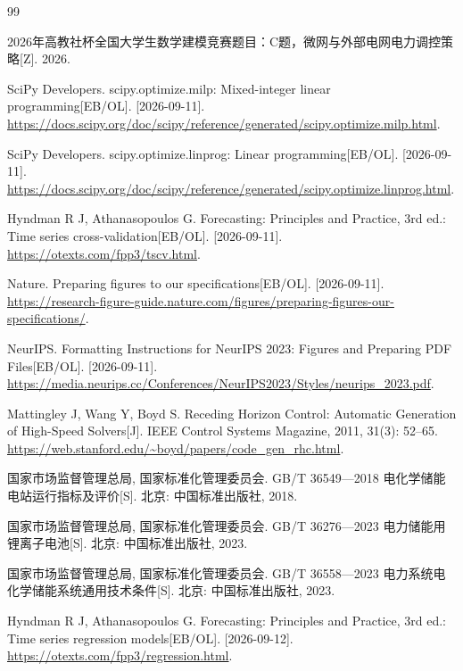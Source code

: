 \begin{thebibliography}{99}

2026年高教社杯全国大学生数学建模竞赛题目：C题，微网与外部电网电力调控策略[Z]. 2026.

SciPy Developers. scipy.optimize.milp: Mixed-integer linear programming[EB/OL].
[2026-09-11]. \url{https://docs.scipy.org/doc/scipy/reference/generated/scipy.optimize.milp.html}.

SciPy Developers. scipy.optimize.linprog: Linear programming[EB/OL].
[2026-09-11]. \url{https://docs.scipy.org/doc/scipy/reference/generated/scipy.optimize.linprog.html}.

Hyndman R J, Athanasopoulos G. Forecasting: Principles and Practice, 3rd ed.: Time series cross-validation[EB/OL].
[2026-09-11]. \url{https://otexts.com/fpp3/tscv.html}.

Nature. Preparing figures to our specifications[EB/OL].
[2026-09-11]. \url{https://research-figure-guide.nature.com/figures/preparing-figures-our-specifications/}.

NeurIPS. Formatting Instructions for NeurIPS 2023: Figures and Preparing PDF Files[EB/OL].
[2026-09-11]. \url{https://media.neurips.cc/Conferences/NeurIPS2023/Styles/neurips_2023.pdf}.

Mattingley J, Wang Y, Boyd S. Receding Horizon Control: Automatic Generation of High-Speed Solvers[J]. IEEE Control Systems Magazine, 2011, 31(3): 52--65.
\url{https://web.stanford.edu/~boyd/papers/code_gen_rhc.html}.

国家市场监督管理总局, 国家标准化管理委员会. GB/T 36549—2018 电化学储能电站运行指标及评价[S]. 北京: 中国标准出版社, 2018.

国家市场监督管理总局, 国家标准化管理委员会. GB/T 36276—2023 电力储能用锂离子电池[S]. 北京: 中国标准出版社, 2023.

国家市场监督管理总局, 国家标准化管理委员会. GB/T 36558—2023 电力系统电化学储能系统通用技术条件[S]. 北京: 中国标准出版社, 2023.

Hyndman R J, Athanasopoulos G. Forecasting: Principles and Practice, 3rd ed.: Time series regression models[EB/OL].
[2026-09-12]. \url{https://otexts.com/fpp3/regression.html}.

\end{thebibliography}
